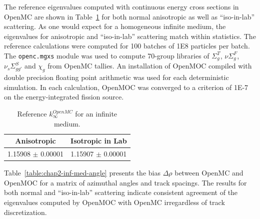 The reference eigenvalues computed with continuous energy cross sections in OpenMC are shown in Table~\ref{table:chap2-inf-med-reference} for both normal anisotropic as well as ``iso-in-lab'' scattering. As one would expect for a homogeneous infinite medium, the eigenvalues for anisotropic and ``iso-in-lab'' scattering match within statistics.  The reference calculations were computed for 100 batches of 1E8 particles per batch. The \texttt{openc.mgxs} module was used to compute 70-group libraries of $\Sigma^T_g$, $\nu\Sigma^F_g$, $\nu_s\Sigma^S_{gg'}$ and $\chi_g$ from OpenMC tallies. An installation of OpenMOC compiled with double precision floating point arithmetic was used for each deterministic simulation. In each calculation, OpenMOC was converged to a criterion of 1E-7 on the energy-integrated fission source.

\begin{table}[h!]
  \centering
  \caption{Reference $k^{OpenMC}_{\infty}$ for an infinite medium.}
  \label{table:chap2-inf-med-reference} 
  \vspace{14pt}
  \begin{tabular}{c c}
  \toprule
  \multicolumn{1}{c}{\bf Anisotropic} &
  \multicolumn{1}{c}{\bf Isotropic in Lab} \\
  \midrule
  1.15908 $\pm$ 0.00001 & 1.15907 $\pm$ 0.00001 \\
  \bottomrule
\end{tabular}
\end{table}

Table~\ref{table:chap2-inf-med-angle} presents the bias $\Delta\rho$ between OpenMC and OpenMOC for a matrix of azimuthal angles and track spacings. The results for both normal and ``iso-in-lab'' scattering indicate consistent agreement of the eigenvalues computed by OpenMOC with OpenMC irregardless of track discretization.

